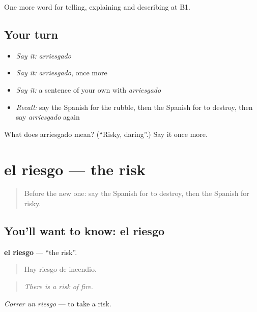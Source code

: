 \begin{grammarlens}[title={What you've built}]
One more word for telling, explaining and describing at B1.
\end{grammarlens}

\subsection*{Your turn}
\begin{itemize}
\raggedright
  \item \emph{Say it:} \emph{arriesgado}
  \item \emph{Say it:} \emph{arriesgado}, once more
  \item \emph{Say it:} a sentence of your own with \emph{arriesgado}
  \item \emph{Recall:} say the Spanish for the rubble, then the Spanish for to destroy, then say \emph{arriesgado} again
\end{itemize}

\begin{tcolorbox}[breakable,colback=teal!4,colframe=teal!35!black,title={Before you move on}]
What does arriesgado mean? (\textquotedblleft{}Risky, daring\textquotedblright{}.) Say it once more.
\end{tcolorbox}
\section[el riesgo]{el riesgo — the risk}

\label{lesson:ES-C530-riesgo}



\begin{quote}
Before the new one: say the Spanish for to destroy, then the Spanish for risky.
\end{quote}

\subsection*{You'll want to know: el riesgo}
\textbf{el riesgo} — \textquotedblleft{}the risk\textquotedblright{}.

\begin{quote}
Hay riesgo de incendio.
\end{quote}

\begin{quote}
\emph{There is a risk of fire.}
\end{quote}

\emph{Correr un riesgo} — to take a risk.

